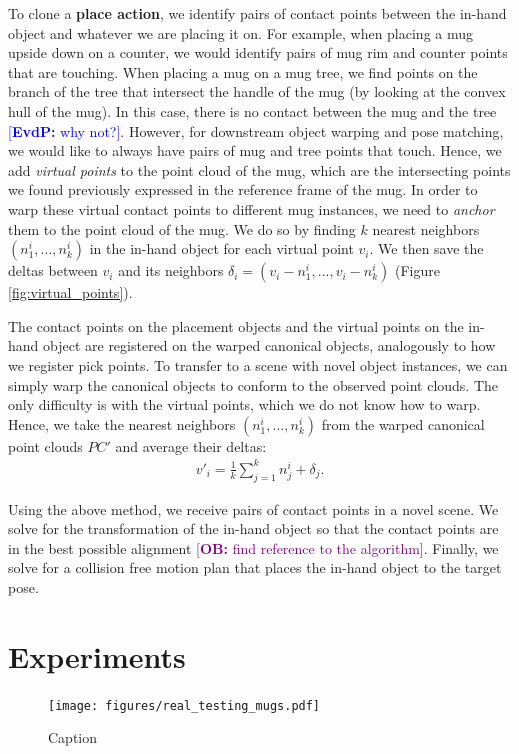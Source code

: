 \documentclass{article}
\newcommand{\ob}[1]{\textcolor{purple}{[\textbf{OB:} #1]}}
\newcommand{\evdp}[1]{\textcolor{blue}{[\textbf{EvdP:} #1]}}
\begin{document}
To clone a \textbf{place action}, we identify pairs of contact points between the in-hand object and whatever we are placing it on. For example, when placing a mug upside down on a counter, we would identify pairs of mug rim and counter points that are touching. When placing a mug on a mug tree, we find points on the branch of the tree that intersect the handle of the mug (by looking at the convex hull of the mug). In this case, there is no contact between the mug and the tree \evdp{why not?}. However, for downstream object warping and pose matching, we would like to always have pairs of mug and tree points that touch. Hence, we add \textit{virtual points} to the point cloud of the mug, which are the intersecting points we found previously expressed in the reference frame of the mug. In order to warp these virtual contact points to different mug instances, we need to \textit{anchor} them to the point cloud of the mug. We do so by finding $k$ nearest neighbors $(n^i_1, ..., n^i_k)$ in the in-hand object for each virtual point $v_i$. We then save the deltas between $v_i$ and its neighbors $\delta_i = (v_i - n^i_1, ..., v_i - n^i_k)$ (Figure \ref{fig:virtual_points}).

The contact points on the placement objects and the virtual points on the in-hand object are registered on the warped canonical objects, analogously to how we register pick points. To transfer to a scene with novel object instances, we can simply warp the canonical objects to conform to the observed point clouds. The only difficulty is with the virtual points, which we do not know how to warp. Hence, we take the nearest neighbors $(n^i_1, ..., n^i_k)$ from the warped canonical point clouds $PC'$ and average their deltas:
\begin{align}
    v'_i = \frac{1}{k} \sum_{j=1}^k n^i_j + \delta_j.
\end{align}

Using the above method, we receive pairs of contact points in a novel scene. We solve for the transformation of the in-hand object so that the contact points are in the best possible alignment \ob{find reference to the algorithm}. Finally, we solve for a collision free motion plan that places the in-hand object to the target pose.

\section{Experiments}

\begin{figure}
    \centering
    \texttt{[image: figures/real\_testing\_mugs.pdf]}
    \caption{Caption}
    \label{fig:my_label}
\end{figure}
\end{document}
